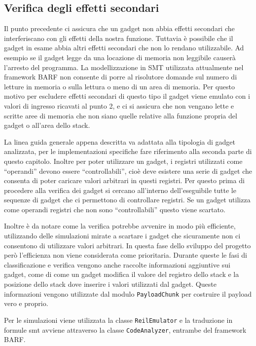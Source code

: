 \begin{inparaenum}[1)]
\subsection{Verifica degli effetti secondari}  

Il punto precedente ci assicura che un gadget non abbia effetti
secondari che interferiscano con gli effetti della nostra
funzione. Tuttavia è possibile che il gadget in esame abbia altri
effetti secondari che non lo rendano utilizzabile. Ad esempio se il
gadget legge da una locazione di memoria non leggibile causerà
l'arresto del programma. La modellizzazione in SMT utilizzata
attualmente nel framework BARF non consente di porre al risolutore
domande sul numero di letture in memoria o sulla lettura o meno di
un area di memoria. Per questo motivo per escludere effetti
secondari di questo tipo il gadget viene emulato con i valori di
ingresso ricavati al punto 2, e ci si assicura che non vengano lette
e scritte aree di memoria che non siano quelle relative alla
funzione propria del gadget o all'area dello stack.


La linea guida generale appena descritta va adattata alla tipologia di
gadget analizzata, per le implementazioni specifiche fare riferimento
alla seconda parte di questo capitolo. Inoltre per poter utilizzare un
gadget, i registri utilizzati come ``operandi'' devono essere
``controllabili'', cioè deve esistere una serie di gadget che consenta
di poter caricare valori arbitrari in questi registri. Per questo
prima di procedere alla verifica dei gadget si cercano all'interno
dell'eseguibile tutte le sequenze di gadget che ci permettono di
controllare registri. Se un gadget utilizza come operandi registri che
non sono ``controllabili'' questo viene scartato.

Inoltre è da notare come la verifica potrebbe avvenire in modo più
efficiente, utilizzando delle simulazioni mirate a scartare i gadget
che sicuramente non ci consentono di utilizzare valori arbitrari. In
questa fase dello sviluppo del progetto però l'efficienza non viene
considerata come prioritaria.  Durante queste le fasi di
classificazione e verifica vengono anche raccolte informazioni
aggiuntive sui gadget, come di come un gadget modifica il valore del
registro dello stack e la posizione dello stack dove inserire i valori
utilizzati dal gadget. Queste informazioni vengono utilizzate dal
modulo \lstinline{PayloadChunk} per costruire il payload vero e proprio.


Per le simulazioni viene utilizzata la classe \lstinline{ReilEmulator}
e la traduzione in formule smt avviene attraverso la classe
\lstinline{CodeAnalyzer}, entrambe del framework BARF.



\end{inparaenum}
